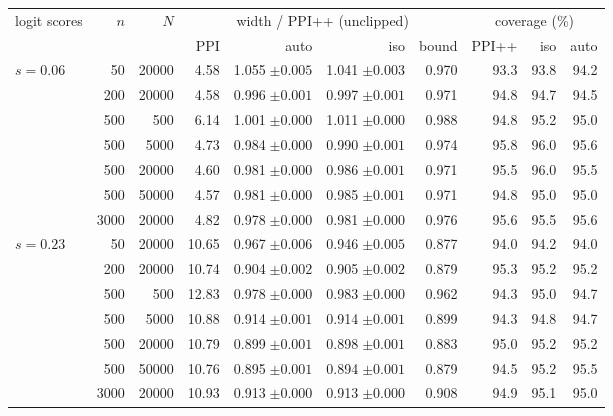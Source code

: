 \begin{tabular}{lrr rrrr rrr}
\toprule
logit scores & $n$ & $N$ & \multicolumn{4}{c}{width / PPI++ (unclipped)} & \multicolumn{3}{c}{coverage (\%)}\\
\cmidrule(lr){4-7}\cmidrule(lr){8-10}
 & & & PPI & auto & iso & bound & PPI++ & iso & auto\\
\midrule
$s{=}0.06$ & 50 & 20000 & 4.58 & 1.055$\;{\scriptstyle\pm0.005}$ & 1.041$\;{\scriptstyle\pm0.003}$ & 0.970 & 93.3 & 93.8 & 94.2\\
 & 200 & 20000 & 4.58 & 0.996$\;{\scriptstyle\pm0.001}$ & 0.997$\;{\scriptstyle\pm0.001}$ & 0.971 & 94.8 & 94.7 & 94.5\\
 & 500 & 500 & 6.14 & 1.001$\;{\scriptstyle\pm0.000}$ & 1.011$\;{\scriptstyle\pm0.000}$ & 0.988 & 94.8 & 95.2 & 95.0\\
 & 500 & 5000 & 4.73 & 0.984$\;{\scriptstyle\pm0.000}$ & 0.990$\;{\scriptstyle\pm0.001}$ & 0.974 & 95.8 & 96.0 & 95.6\\
 & 500 & 20000 & 4.60 & 0.981$\;{\scriptstyle\pm0.000}$ & 0.986$\;{\scriptstyle\pm0.001}$ & 0.971 & 95.5 & 96.0 & 95.5\\
 & 500 & 50000 & 4.57 & 0.981$\;{\scriptstyle\pm0.000}$ & 0.985$\;{\scriptstyle\pm0.001}$ & 0.971 & 94.8 & 95.0 & 95.0\\
 & 3000 & 20000 & 4.82 & 0.978$\;{\scriptstyle\pm0.000}$ & 0.981$\;{\scriptstyle\pm0.000}$ & 0.976 & 95.6 & 95.5 & 95.6\\
\midrule
$s{=}0.23$ & 50 & 20000 & 10.65 & 0.967$\;{\scriptstyle\pm0.006}$ & 0.946$\;{\scriptstyle\pm0.005}$ & 0.877 & 94.0 & 94.2 & 94.0\\
 & 200 & 20000 & 10.74 & 0.904$\;{\scriptstyle\pm0.002}$ & 0.905$\;{\scriptstyle\pm0.002}$ & 0.879 & 95.3 & 95.2 & 95.2\\
 & 500 & 500 & 12.83 & 0.978$\;{\scriptstyle\pm0.000}$ & 0.983$\;{\scriptstyle\pm0.000}$ & 0.962 & 94.3 & 95.0 & 94.7\\
 & 500 & 5000 & 10.88 & 0.914$\;{\scriptstyle\pm0.001}$ & 0.914$\;{\scriptstyle\pm0.001}$ & 0.899 & 94.3 & 94.8 & 94.7\\
 & 500 & 20000 & 10.79 & 0.899$\;{\scriptstyle\pm0.001}$ & 0.898$\;{\scriptstyle\pm0.001}$ & 0.883 & 95.0 & 95.2 & 95.2\\
 & 500 & 50000 & 10.76 & 0.895$\;{\scriptstyle\pm0.001}$ & 0.894$\;{\scriptstyle\pm0.001}$ & 0.879 & 94.5 & 95.2 & 95.5\\
 & 3000 & 20000 & 10.93 & 0.913$\;{\scriptstyle\pm0.000}$ & 0.913$\;{\scriptstyle\pm0.000}$ & 0.908 & 94.9 & 95.1 & 95.0\\
\bottomrule
\end{tabular}
